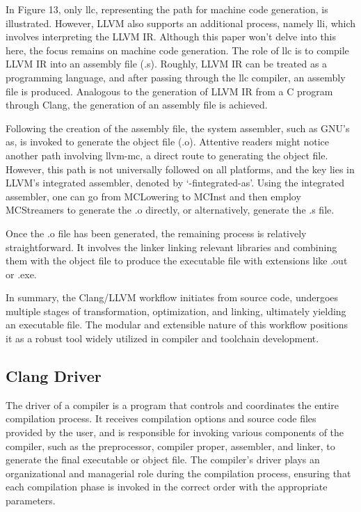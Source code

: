 \documentclass[conference]{IEEEtran}
\begin{document}
In Figure 13, only llc, representing the path for machine code generation, is illustrated. However, LLVM also supports an additional process, namely lli, which involves interpreting the LLVM IR. Although this paper won't delve into this here, the focus remains on machine code generation. The role of llc is to compile LLVM IR into an assembly file (.s). Roughly, LLVM IR can be treated as a programming language, and after passing through the llc compiler, an assembly file is produced. Analogous to the generation of LLVM IR from a C program through Clang, the generation of an assembly file is achieved.

Following the creation of the assembly file, the system assembler, such as GNU's as, is invoked to generate the object file (.o). Attentive readers might notice another path involving llvm-mc, a direct route to generating the object file. However, this path is not universally followed on all platforms, and the key lies in LLVM's integrated assembler, denoted by `-fintegrated-as'. Using the integrated assembler, one can go from MCLowering to MCInst and then employ MCStreamers to generate the .o directly, or alternatively, generate the .s file. \cite{b9}

Once the .o file has been generated, the remaining process is relatively straightforward. It involves the linker linking relevant libraries and combining them with the object file to produce the executable file with extensions like .out or .exe.

In summary, the Clang/LLVM workflow initiates from source code, undergoes multiple stages of transformation, optimization, and linking, ultimately yielding an executable file. The modular and extensible nature of this workflow positions it as a robust tool widely utilized in compiler and toolchain development.

\subsection{Clang Driver}

The driver of a compiler is a program that controls and coordinates the entire compilation process. It receives compilation options and source code files provided by the user, and is responsible for invoking various components of the compiler, such as the preprocessor, compiler proper, assembler, and linker, to generate the final executable or object file. The compiler's driver plays an organizational and managerial role during the compilation process, ensuring that each compilation phase is invoked in the correct order with the appropriate parameters.
\end{document}
